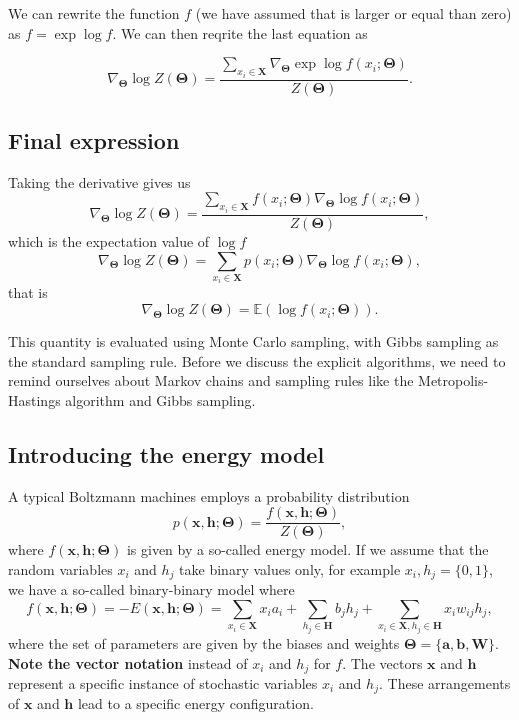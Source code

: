 \documentclass[%
oneside,                 %
final,                   %
10pt]{article}
\begin{document}
We can rewrite the function $f$ (we have assumed that is larger or
equal than zero) as $f=\exp{\log{f}}$. We can then reqrite the last
equation as

\[
\nabla_{\bm{\Theta}}\log{Z(\bm{\Theta})}=\frac{ \sum_{x_i\in \bm{X}} \nabla_{\bm{\Theta}}\exp{\log{f(x_i;\bm{\Theta})}}   }{Z(\bm{\Theta})}.
\]

\subsection{Final expression}

Taking the derivative gives us
\[
\nabla_{\bm{\Theta}}\log{Z(\bm{\Theta})}=\frac{ \sum_{x_i\in \bm{X}}f(x_i;\bm{\Theta}) \nabla_{\bm{\Theta}}\log{f(x_i;\bm{\Theta})}   }{Z(\bm{\Theta})}, 
\]
which is the expectation value of $\log{f}$
\[
\nabla_{\bm{\Theta}}\log{Z(\bm{\Theta})}=\sum_{x_i\in \bm{X}}p(x_i;\bm{\Theta}) \nabla_{\bm{\Theta}}\log{f(x_i;\bm{\Theta})},
\]
that is
\[
\nabla_{\bm{\Theta}}\log{Z(\bm{\Theta})}=\mathbb{E}(\log{f(x_i;\bm{\Theta})}).
\]

This quantity is evaluated using Monte Carlo sampling, with Gibbs
sampling as the standard sampling rule.  Before we discuss the
explicit algorithms, we need to remind ourselves about Markov chains
and sampling rules like the Metropolis-Hastings algorithm and Gibbs
sampling.

\subsection{Introducing the energy model}

A typical Boltzmann machines employs a probability distribution
\[
p(\bm{x},\bm{h};\bm{\Theta}) = \frac{f(\bm{x},\bm{h};\bm{\Theta})}{Z(\bm{\Theta})},
\]
where $f(\bm{x},\bm{h};\bm{\Theta})$ is given by a so-called energy model. If we assume that the random variables $x_i$ and $h_j$ take binary values only, for example $x_i,h_j=\{0,1\}$, we have a so-called binary-binary model where
\[
f(\bm{x},\bm{h};\bm{\Theta})=-E(\bm{x}, \bm{h};\bm{\Theta}) = \sum_{x_i\in \bm{X}} x_i a_i+\sum_{h_j\in \bm{H}} b_j h_j + \sum_{x_i\in \bm{X},h_j\in\bm{H}} x_i w_{ij} h_j,
\]
where the set of parameters are given by the biases and weights $\bm{\Theta}=\{\bm{a},\bm{b},\bm{W}\}$.
\textbf{Note the vector notation} instead of $x_i$ and $h_j$ for $f$. The vectors $\bm{x}$ and $\bm{h}$ represent a specific instance of stochastic variables $x_i$ and $h_j$. These arrangements of $\bm{x}$ and $\bm{h}$ lead to a specific energy configuration.
\end{document}
